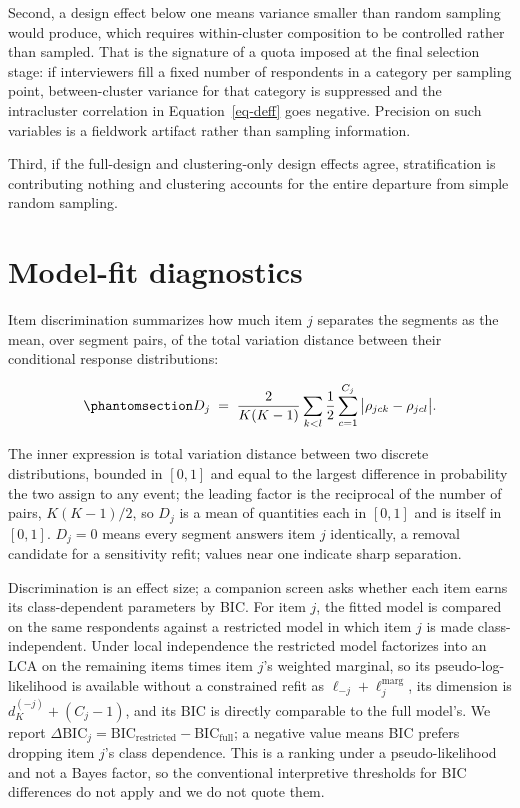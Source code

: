 \documentclass[
  12pt]{article}
\begin{document}
Second, a design effect below one means variance smaller than random
sampling would produce, which requires within-cluster composition to be
controlled rather than sampled. That is the signature of a quota imposed
at the final selection stage: if interviewers fill a fixed number of
respondents in a category per sampling point, between-cluster variance
for that category is suppressed and the intracluster correlation in
Equation~\ref{eq-deff} goes negative. Precision on such variables is a
fieldwork artifact rather than sampling information.

Third, if the full-design and clustering-only design effects agree,
stratification is contributing nothing and clustering accounts for the
entire departure from simple random sampling.

\section{Model-fit diagnostics}\label{sec-diagnostics}

Item discrimination summarizes how much item \(j\) separates the
segments as the mean, over segment pairs, of the total variation
distance between their conditional response distributions:

\begin{equation}\phantomsection\label{eq-discrim}{
D_j \;=\; \frac{2}{K(K-1)} \sum_{k < l} \frac{1}{2} \sum_{c=1}^{C_j}
\big| \rho_{jck} - \rho_{jcl} \big| .
}\end{equation}

The inner expression is total variation distance between two discrete
distributions, bounded in \([0,1]\) and equal to the largest difference
in probability the two assign to any event; the leading factor is the
reciprocal of the number of pairs, \(K(K-1)/2\), so \(D_j\) is a mean of
quantities each in \([0,1]\) and is itself in \([0,1]\). \(D_j = 0\)
means every segment answers item \(j\) identically, a removal candidate
for a sensitivity refit; values near one indicate sharp separation.

Discrimination is an effect size; a companion screen asks whether each
item earns its class-dependent parameters by BIC. For item \(j\), the
fitted model is compared on the same respondents against a restricted
model in which item \(j\) is made class-independent. Under local
independence the restricted model factorizes into an LCA on the
remaining items times item \(j\)'s weighted marginal, so its
pseudo-log-likelihood is available without a constrained refit as
\(\ell_{-j} + \ell_j^{\mathrm{marg}}\), its dimension is
\(d_K^{(-j)} + (C_j - 1)\), and its BIC is directly comparable to the
full model's. We report
\(\Delta\mathrm{BIC}_j = \mathrm{BIC}_{\mathrm{restricted}} - \mathrm{BIC}_{\mathrm{full}}\);
a negative value means BIC prefers dropping item \(j\)'s class
dependence. This is a ranking under a pseudo-likelihood and not a Bayes
factor, so the conventional interpretive thresholds for BIC differences
do not apply and we do not quote them.
\end{document}
